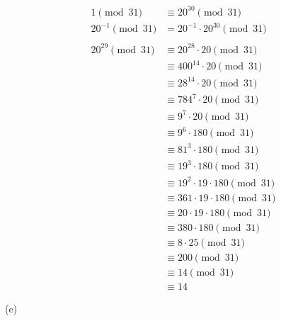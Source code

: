 \begin{solution}
\begin{align*}
1 \pmod {31} &\equiv 20^{30} \pmod{31} \\ 
20^{-1} \pmod{31} &= 20^{-1} \cdot 20^{30} \pmod{31} \\
\\
20^{29} \pmod{31} &\equiv 20^{28} \cdot 20 \pmod{31} \\
&\equiv 400^{14} \cdot 20 \pmod{31} \\
&\equiv 28^{14} \cdot 20 \pmod{31} \\
&\equiv 784^{7} \cdot 20 \pmod{31} \\
&\equiv 9^{7} \cdot 20 \pmod{31} \\
&\equiv 9^{6} \cdot 180 \pmod{31} \\
&\equiv 81^{3} \cdot 180 \pmod{31} \\
&\equiv 19^{3} \cdot 180 \pmod{31} \\
&\equiv 19^{2} \cdot 19 \cdot 180 \pmod{31} \\
&\equiv 361 \cdot 19 \cdot 180 \pmod{31} \\
&\equiv 20 \cdot 19 \cdot 180 \pmod{31} \\
&\equiv 380 \cdot 180 \pmod{31} \\
&\equiv 8 \cdot 25 \pmod{31} \\
&\equiv 200 \pmod{31} \\
&\equiv 14 \pmod{31} \\
&\equiv 14
\end{align*}

\pagebreak
(e)


\end{solution}

